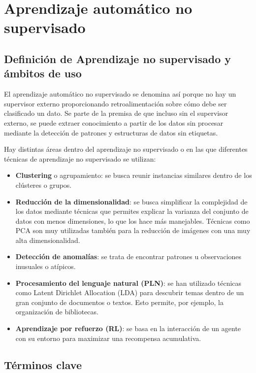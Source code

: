 \chapter{Aprendizaje automático no supervisado}

\section{Definición de Aprendizaje no supervisado y ámbitos de uso}

El aprendizaje automático no supervisado se denomina así porque no hay un supervisor externo proporcionando retroalimentación sobre cómo debe ser clasificado un dato. Se parte de la premisa de que incluso sin el supervisor externo, se puede extraer conocimiento a partir de los datos sin procesar mediante la detección de patrones y estructuras de datos sin etiquetas.

Hay distintas áreas dentro del aprendizaje no supervisado o en las que diferentes técnicas de aprendizaje no supervisado se utilizan:

\begin{itemize}
    \item \textbf{Clustering} o agrupamiento: se busca reunir instancias similares dentro de los clústeres o grupos.

    \item \textbf{Reducción de la dimensionalidad}: se busca simplificar la complejidad de los datos mediante técnicas que permites explicar la varianza del conjunto de datos con menos dimensiones, lo que los hace más manejables. Técnicas como PCA son muy utilizadas también para la reducción de imágenes con una muy alta dimensionalidad.

    \item \textbf{Detección de anomalías}: se trata de encontrar patrones u observaciones inusuales o atípicos.

    \item \textbf{Procesamiento del lenguaje natural (PLN)}: se han utilizado técnicas como Latent Dirichlet Allocation (LDA) para descubrir temas dentro de un gran conjunto de documentos o textos. Esto permite, por ejemplo, la organización de bibliotecas.

    \item \textbf{Aprendizaje por refuerzo (RL)}: se basa en la interacción de un agente con su entorno para maximizar una recompensa acumulativa.
\end{itemize}


\section{Términos clave}


